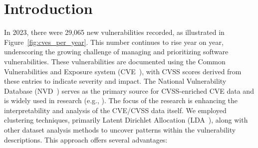 \section{Introduction}

In 2023, there were 29,065 new vulnerabilities recorded, as illustrated in Figure~\ref{fig:cves_per_year}. This number continues to rise year on year, underscoring the growing challenge of managing and prioritizing software vulnerabilities. These vulnerabilities are documented using the Common Vulnerabilities and Exposure system (CVE~\cite{CVE}), with CVSS scores derived from these entries to indicate severity and impact. The National Vulnerability Database (NVD~\cite{NVD}) serves as the primary source for CVSS-enriched CVE data and is widely used in research (e.g., \cite{costa, nvd_example1, nvd_example2}). The focus of the research is enhancing the interpretability and analysis of the CVE/CVSS data itself. We employed clustering techniques, primarily Latent Dirichlet Allocation (LDA~\cite{lda_origin}), along with other dataset analysis methods to uncover patterns within the vulnerability descriptions. This approach offers several advantages:


